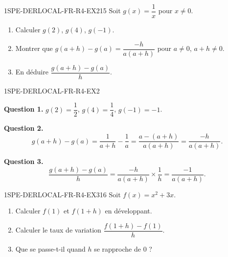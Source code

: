 
\begin{exercice}{1SPE-DERLOCAL-FR-R4-EX2}{1}{5}
Soit $g(x) = \dfrac{1}{x}$ pour $x
\neq 0$.
\begin{enumerate}
  \item Calculer $g(2)$, $g(4)$, $g(-1)$.
  \item Montrer que $g(a+h) - g(a) = \dfrac{-h}{a(a+h)}$ pour $a
\neq 0$, $a+h
\neq 0$.
  \item En déduire $\dfrac{g(a+h)-g(a)}{h}$.
\end{enumerate}
\end{exercice}


\begin{corrige}{1SPE-DERLOCAL-FR-R4-EX2}

\textbf{Question 1.}
$g(2) = \dfrac{1}{2}$, \quad $g(4) = \dfrac{1}{4}$, \quad $g(-1) = -1$.


\textbf{Question 2.}
\[
g(a+h) - g(a) = \frac{1}{a+h} - \frac{1}{a} = \frac{a - (a+h)}{a(a+h)} = \frac{-h}{a(a+h)}.
\]

\textbf{Question 3.}
\[
\frac{g(a+h) - g(a)}{h} = \frac{-h}{a(a+h)} \times \frac{1}{h} = \frac{-1}{a(a+h)}.
\]

\end{corrige}


\begin{exercice}{1SPE-DERLOCAL-FR-R4-EX3}{1}{6}
Soit $f(x) = x^2 + 3x$.
\begin{enumerate}
  \item Calculer $f(1)$ et $f(1+h)$ en développant.
  \item Calculer le taux de variation $\dfrac{f(1+h)-f(1)}{h}$.
  \item Que se passe-t-il quand $h$ se rapproche de $0$ ?
\end{enumerate}
\end{exercice}


